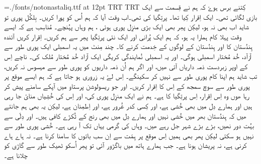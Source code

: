 \nopagenumbers
\parindent=0mm
\font\noto={./fonts/notonastaliq.ttf} at 12pt
\textdir TRT
\pardir TRT
\noto
کِتنے برس ہوۓ کہ ہم نے قِسمت سے ایک بازی لگائی تھی۔ ایک اِقرار کِیا تھا۔ پرتِگیا کی
تھی۔اب وقت آیا کہ ہم اُس کو پورا کریں۔ بِلکُل پوری تو شاید اب بھی نہ ہو، لیکِن پھِر
بھی ایک بڑی منزِل پوری ہوئی ، ہم وہاں پہُنچے۔ مُناسِب ہے کہ ایسے وقت پہلا کام ہمارا
یہ ہو، کہ ہم ایک پُرانی اور ایک نئی پرتِگیا پھِر سے ہم کریں۔ اِقرار کریں آئندہ
ہِندُستان کا اور ہِندُستان کے لوگوں کے خِدمت کرنے کا۔ چند مِنٹ میں یہ اسمبلی ایک پوری
طور سے آزآد، خُد مُختار اسمبلی ہوگی۔ اور یہ اسمبلی نُمایندگی کریگی ایک آزاد خُد
مُختار مُلک کی۔ ناچے اِس کے اوپر زبردست ذمہ داریاں آتی ھیں، اور اگر ہم اُن ذمہ
داریوں کو پوری طور سے مہسوس نہ کریں، تب شاید ہم اپنا کام پوری طور سے نہیں کر
سکینگے۔ اِس لۓ یہ زروری ہو جاتا ہے کہ ہم ایسے موقع پر پوری طور سے سوچ سمجھ کے اِس
کا اِقرار کریں۔ اور جو ریسولوشن پرستاو میں آپکے سامنے پیش کر رہا ھوں وہ اِس
اِقرار، اِس پرتِگیا کا ہے۔ ہم نے ایک منزِل پوری کی، اور اِس کی خُشِیاں منایٔ جا رہی ہیں
اور ہمارے دِل میں بھی خُشی ہے، اور کِسی کدر غُرور ہے، اور اِطمِنان ہے، لیکِن یہ بھی ہم
جانتے ھیں کہ ہِندُستان بھر میں خُشی نہیں اور ہمارے دِل میں بھی رنج کے ٹُکڑے کافی
ہیں۔ اور دِلّی سے بہُت دور نھیں، بڑے بڑے شہر جل رہے ھیں۔ وہاں کی گرمی یہاں تک آ
رہی ہے۔ خُشی پوری طور سے نہیں ہو سکتی لیکِن پھر بھی ہمیں اِس موقع پر ہِمّت سے اِن سب
باتوں کا سامنا کرنا ہے۔ نہ ہاے ہاے کرنی ہے، نہ پریشان ہونا ہے۔ جب ہمارے ہاتھ
میں باگڑور آئی تو پھِر اُسکو ٹھیک طور سے گاڑی کو چلانا ہے۔
\bye
